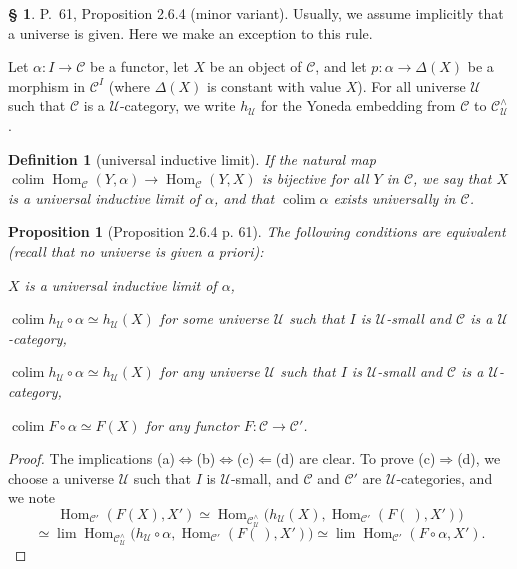 \documentclass[12pt]{article}
\newtheorem{prop}[thm]{Proposition}
\newtheorem{df}[thm]{Definition}
\theoremstyle{remark}
\theoremstyle{definition}
\newtheorem{s}[thm]{\S}
\newcommand{\nn}{\noindent}
\newcommand{\C}{\mathcal C}
\newcommand{\U}{\mathcal U}
\newcommand{\si}{\Leftarrow}
\newcommand{\ssi}{\Leftrightarrow}
\newcommand{\then}{\Rightarrow}
\DeclareMathOperator*{\colim}{colim}
\DeclareMathOperator{\Hom}{Hom}
\begin{document}
\begin{s} 
P.~61, Proposition 2.6.4 (minor variant). Usually, we assume implicitly that a universe is given. Here we make an exception to this rule. 

Let $\alpha:I\to\C$ be a functor, let $X$ be an object of $\C$, and let $p:\alpha\to\Delta(X)$ be a morphism in $\C^I$ (where $\Delta(X)$ is constant with value $X$). For all universe $\U$ such that $\C$ is a $\U$-category, we write $h_\U$ for the Yoneda embedding from $\C$ to $\C^\wedge_\U$.

\begin{df}[universal inductive limit]\label{uil}
If the natural map $\colim\Hom_\C(Y,\alpha)\to\Hom_\C(Y,X)$ is bijective for all $Y$ in $\C$, we say that $X$ is a {\em universal} inductive limit of $\alpha$, and that $\colim\alpha$ exists {\em universally} in $\C$.
\end{df}

\begin{prop}[Proposition 2.6.4 p. 61]\label{puil}
The following conditions are equivalent (recall that no universe is given {\em a priori}):

\nn{\em(a)} $X$ is a universal inductive limit of $\alpha$,

\nn{\em(b)} $\colim h_\U\circ\alpha\simeq h_\U(X)$ for \emph{some} universe $\U$ such that $I$ is $\U$-small and $\C$ is a $\U$-category,

\nn{\em(c)} $\colim h_\U\circ\alpha\simeq h_\U(X)$ for \emph{any} universe $\U$ such that $I$ is $\U$-small and $\C$ is a $\U$-category, 

\nn{\em(d)} $\colim F\circ\alpha\simeq F(X)$ for \emph{any} functor $F:\C\to\C'$. 
\end{prop}

\begin{proof} The implications (a)$\ssi$(b)$\ssi$(c)$\si$(d) are clear. To prove (c)$\then$(d), we choose a universe $\U$ such that $I$ is $\U$-small, and $\C$ and $\C'$ are $\U$-categories, and we note
$$
\Hom_{\C'}(F(X),X')\simeq\Hom_{\C^\wedge_\U}\big(h_\U(X),\Hom_{\C'}(F(\ ),X')\big)
$$
$$
\simeq\lim\Hom_{\C^\wedge_\U}\big(h_\U\circ\alpha,\Hom_{\C'}(F(\ ),X')\big)\simeq\lim\Hom_{\C'}(F\circ\alpha,X').
$$
\end{proof}
\end{s}

%
\end{document}
